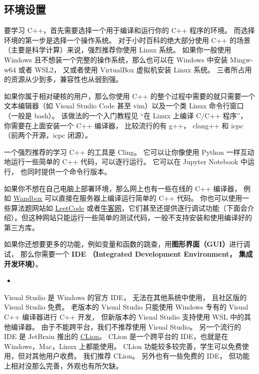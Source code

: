

\begin{issues}
\issueDraft
\end{issues}

\subsection{环境设置}

要学习 C++，首先需要选择一个用于编译和运行你的 C++ 程序的环境。 而选择环境的第一步是选择一个操作系统。 对于小时百科的绝大部分使用 C++ 的场景（主要是科学计算）来说，强烈推荐你使用 Linux 系统。 如果你一般使用 Windows 且不想装一个完整的操作系统，那么也可以在 Windows 中安装 Mingw-w64 或者 WSL2， 又或者使用 VirtualBox 虚拟机安装 Linux 系统。 三者所占用的资源从少到多，兼容性也从弱到强。

如果你属于相对硬核的用户，那么你使用 C++ 的整个过程中需要的就只需要一个文本编辑器（如 Visual Studio Code 甚至 vim）以及一个类 Linux 命令行窗口（一般是 bash）。 该做法的一个入门教程见 “在 Linux 上编译 C/C++ 程序”， 你需要在上面安装一个 C++ 编译器， 比较流行的有 g++， clang++ 和 icpc（前两个开源，icpc 闭源）。

一个强烈推荐的学习 C++ 的工具是 Cling。 它可以让你像使用 Python 一样互动地运行一些简单的 C++ 代码，可以逐行运行。 它可以在 Jupyter Notebook 中运行， 也同时提供一个命令行版本。

如果你不想在自己电脑上部署环境，那么网上也有一些在线的 C++ 编译器， 例如 \href{https://wandbox.org/}{Wandbox} 可以直接在服务器上编译运行简单的 C++ 代码。 你也可以使用一些算法题网站如 \href{https://leetcode.com/}{LeetCode} 或者\href{https://www.nowcoder.com/}{牛客网}，它们甚至还提供逐行调试功能（下面会介绍）。但这种网站只能运行一些简单的测试代码，一般不支持安装和使用编译好的第三方库。

如果你还想要更多的功能，例如变量和函数的跳查，用\textbf{图形界面（GUI）}进行调试， 那么你需要一个 \textbf{IDE （Integrated Development Environment， 集成开发环境）}。
\begin{itemize}
\item 
\end{itemize}

Visual Studio 是 Windows 的官方 IDE， 无法在其他系统中使用， 且社区版的 Visual Studio 免费。 老版本的 Visual Studio 只能使用 Windows 专有的 Visual C++ 编译器进行 C++ 开发， 但新版本的 Visual Studio 支持使用 WSL 中的其他编译器。 由于不能跨平台，我们不推荐使用 Visual Studio。 另一个流行的 IDE 是 JetBrain 推出的 \href{https://www.jetbrains.com/clion/}{CLion}。 CLion 是一个跨平台的 IDE，也就是在 Windows，Mac，Linux 上都能使用。  CLion 功能较多较完善，学生可以免费使用，但对其他用户收费。 我们推荐 CLion。 另外也有一些免费的 IDE， 但功能上相对没那么完善，外观也有所欠缺。

